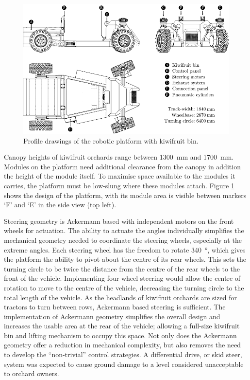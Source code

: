 \documentclass[preprint,authoryear,12pt]{elsarticle}
\begin{document}
    \begin{figure}[htb]
        \centering
        \includegraphics[width=\linewidth]{imgs/profile_views/AMMP-All-Labelled.pdf}
        \caption{Profile drawings of the robotic platform with kiwifruit bin.}
        \label{fig:AMMP}
    \end{figure}

    Canopy heights of kiwifruit orchards range between \SI{1300}{\milli\meter} and \SI{1700}{\milli\meter}.
    Modules on the platform need additional clearance from the canopy in addition the height of the module itself.
    To maximise space available to the modules it carries, the platform must be low-slung where these modules attach.
    Figure \ref{fig:AMMP} shows the design of the platform, with its module area is visible between markers `F' and `E' in the side view (top left).

    Steering geometry is Ackermann based with independent motors on the front wheels for actuation.
    The ability to actuate the angles individually simplifies the mechanical geometry needed to coordinate the steering wheels, especially at the extreme angles.
    Each steering wheel has the freedom to rotate \SI{340}{\degree}, which gives the platform the ability to pivot about the centre of its rear wheels.
    This sets the turning circle to be twice the distance from the centre of the rear wheels to the front of the vehicle.
    Implementing four wheel steering would allow the centre of rotation to move to the centre of the vehicle, decreasing the turning circle to the total length of the vehicle.
    As the headlands of kiwifruit orchards are sized for tractors to turn between rows, Ackermann based steering is sufficient.
    The implementation of Ackermann geometry simplifies the overall design and increases the usable area at the rear of the vehicle; allowing a full-size kiwifruit bin and lifting mechanism to occupy this space.
    Not only does the Ackermann geometry offer a reduction in mechanical complexity, but also removes the need to develop the ``non-trivial'' control strategies.
    A differential drive, or skid steer, system was expected to cause ground damage to a level considered unacceptable to orchard owners.
\end{document}
